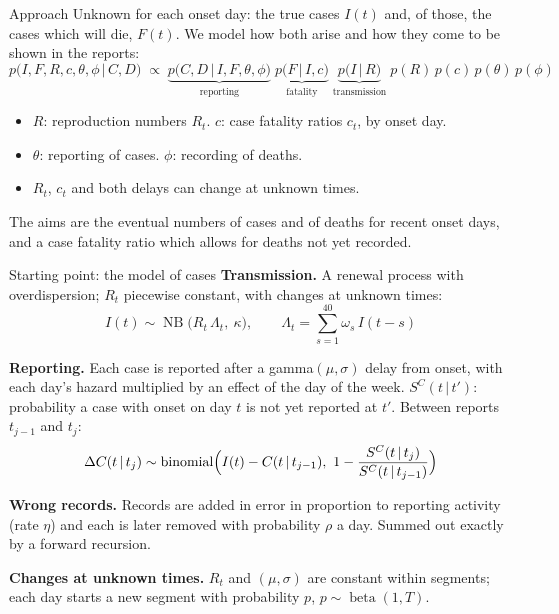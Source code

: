 \documentclass[aspectratio=169,9pt]{beamer}
\newcommand{\given}{\,|\,}
\newcommand{\bin}{\operatorname{binomial}}
\begin{document}
\begin{frame}{Approach}
Unknown for each onset day: the true cases $I(t)$ and, of those, the cases
which will die, $F(t)$. We model how both arise and how they come to be
shown in the reports:
\[
p\bigl(I, F, R, c, \theta, \phi \given C, D\bigr)\;\propto\;
\underbrace{p\bigl(C, D\given I, F, \theta, \phi\bigr)}_{\text{reporting}}\;
\underbrace{p\bigl(F\given I, c\bigr)}_{\text{fatality}}\;
\underbrace{p\bigl(I\given R\bigr)}_{\text{transmission}}\;
p(R)\,p(c)\,p(\theta)\,p(\phi)
\]

\bigskip
\begin{itemize}
\item $R$: reproduction numbers $R_t$. $c$: case fatality ratios $c_t$, by
onset day.
\item $\theta$: reporting of cases. $\phi$: recording of deaths.
\item $R_t$, $c_t$ and both delays can change at unknown times.
\end{itemize}

\bigskip
The aims are the eventual numbers of cases and of deaths for recent onset
days, and a case fatality ratio which allows for deaths not yet recorded.
\end{frame}

\begin{frame}{Starting point: the model of cases}
\textbf{Transmission.} A renewal process with overdispersion; $R_t$
piecewise constant, with changes at unknown times:
\[
I(t)\sim\operatorname{NB}\bigl(R_t\,\Lambda_t,\ \kappa\bigr),\qquad
\Lambda_t=\sum_{s=1}^{40}\omega_s\,I(t-s)
\]

\textbf{Reporting.} Each case is reported after a gamma$(\mu,\sigma)$ delay
from onset, with each day's hazard multiplied by an effect of the day of the
week. $S^{C}(t\given t')$: probability a case with onset on day $t$ is not
yet reported at $t'$. Between reports $t_{j-1}$ and $t_j$:
\[
\Delta C(t\given t_j)\sim\bin\Bigl(I(t)-C(t\given t_{j-1}),\
1-\frac{S^{C}(t\given t_j)}{S^{C}(t\given t_{j-1})}\Bigr)
\]

\textbf{Wrong records.} Records are added in error in proportion to
reporting activity (rate $\eta$) and each is later removed with probability
$\rho$ a day. Summed out exactly by a forward recursion.

\bigskip
\textbf{Changes at unknown times.} $R_t$ and $(\mu,\sigma)$ are constant
within segments; each day starts a new segment with probability $p$,
$p\sim\operatorname{beta}(1,T)$.
\end{frame}
\end{document}
